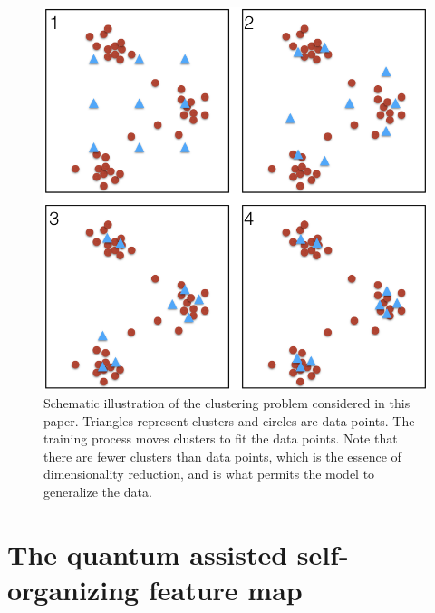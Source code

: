 \documentclass[%
  pra, aps, physrev,
  showkeys,
  twocolumn,
  showpacs,
  superscriptaddress,
  amsmath,amssymb,
  10pt
]{revtex4-2}
\begin{document}
\begin{figure}
    \includegraphics[width=0.95\columnwidth]{sofm_fitting.png}
  \caption{
    Schematic illustration of the clustering problem considered in this paper.
    Triangles represent clusters and circles are data points.
    The training process moves clusters to fit the data points.
    Note that there are fewer clusters than data points,
    which is the essence of dimensionality reduction,
    and is what permits the model to generalize the data.
  }
  \label{fig:sofm_fitting}
\end{figure}


























\section{The quantum assisted self-organizing feature map}
\label{sec:qasofm}
\end{document}
